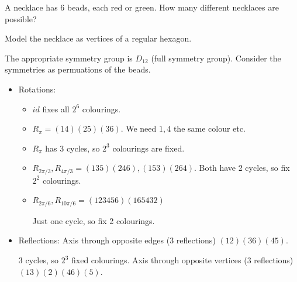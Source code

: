 \documentclass{article}
\theoremstyle{definition} \newtheorem*{definition}{Definition}
\begin{document}
\begin{exmps} A necklace has 6 beads, each red or green. How many different
  necklaces are possible?

  Model the necklace as vertices of a regular hexagon.

  The appropriate symmetry group is $D_{12}$ (full symmetry group). Consider the
  symmetries as permuations of the beads.

  \begin{itemize} \item Rotations: \begin{itemize} \item $id$ fixes all $2^6$
          colourings.  \item $R_\pi = (14)(25)(36)$.  We need $1,4$ the same
          colour etc.  \item $R_\pi$ has 3 cycles, so $2^3$ colourings are
            fixed.

      \item $R_{2\pi/3},R_{4\pi/3}=(135)(246),(153)(264)$.  Both have 2 cycles,
      so fix $2^2$ colourings.  \item $R_{2\pi/6},R_{10\pi/6}=(123456)(165432)$

       Just one cycle, so fix 2 colourings.  \end{itemize}
      

     \item Reflections: Axis through opposite edges (3 reflections)
       $(12)(36)(45)$. 
       \begin{figure}[h] \centering {}

         \label{fig:necklace1} \end{figure}
      
       
       3 cycles, so $2^3$ fixed colourings. 
Axis through opposite vertices (3 reflections) $(13)(2)(46)(5)$.


\end{itemize}
\end{exmps}
\end{document}
